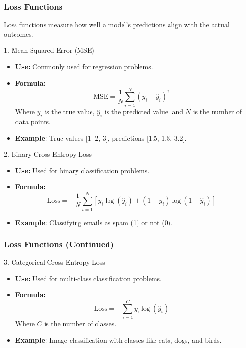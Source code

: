 \documentclass[aspectratio=169]{beamer}
\begin{document}
\begin{frame}[fragile]
    \frametitle{Loss Functions}
    Loss functions measure how well a model's predictions align with the actual outcomes. 

    \begin{block}{1. Mean Squared Error (MSE)}
        \begin{itemize}
            \item \textbf{Use:} Commonly used for regression problems.
            \item \textbf{Formula:}
            \begin{equation}
            \text{MSE} = \frac{1}{N} \sum_{i=1}^{N} (y_i - \hat{y}_i)^2
            \end{equation}
            Where \(y_i\) is the true value, \(\hat{y}_i\) is the predicted value, and \(N\) is the number of data points.
            \item \textbf{Example:} True values [1, 2, 3], predictions [1.5, 1.8, 3.2].
        \end{itemize}
    \end{block}
    
    \begin{block}{2. Binary Cross-Entropy Loss}
        \begin{itemize}
            \item \textbf{Use:} Used for binary classification problems.
            \item \textbf{Formula:}
            \begin{equation}
            \text{Loss} = -\frac{1}{N} \sum_{i=1}^{N} [y_i \log(\hat{y}_i) + (1-y_i) \log(1-\hat{y}_i)]
            \end{equation}
            \item \textbf{Example:} Classifying emails as spam (1) or not (0).
        \end{itemize}
    \end{block}
\end{frame}

\begin{frame}[fragile]
    \frametitle{Loss Functions (Continued)}
    \begin{block}{3. Categorical Cross-Entropy Loss}
        \begin{itemize}
            \item \textbf{Use:} Used for multi-class classification problems.
            \item \textbf{Formula:}
            \begin{equation}
            \text{Loss} = -\sum_{i=1}^{C} y_i \log(\hat{y}_i)
            \end{equation}
            Where \(C\) is the number of classes.
            \item \textbf{Example:} Image classification with classes like cats, dogs, and birds.
        \end{itemize}
    \end{block}
\end{frame}
\end{document}
